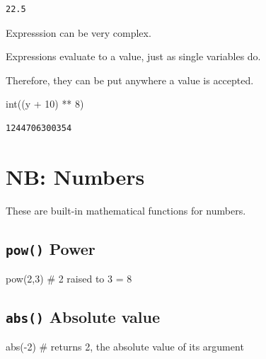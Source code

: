 \documentclass[
  letterpaper,
  DIV=11,
  numbers=noendperiod]{scrreprt}
\newenvironment{Shaded}{\begin{snugshade}}{\end{snugshade}}
\newcommand{\BuiltInTok}[1]{\textcolor[rgb]{0.00,0.23,0.31}{#1}}
\newcommand{\CommentTok}[1]{\textcolor[rgb]{0.37,0.37,0.37}{#1}}
\newcommand{\DecValTok}[1]{\textcolor[rgb]{0.68,0.00,0.00}{#1}}
\newcommand{\NormalTok}[1]{\textcolor[rgb]{0.00,0.23,0.31}{#1}}
\newcommand{\OperatorTok}[1]{\textcolor[rgb]{0.37,0.37,0.37}{#1}}
\begin{document}
\begin{verbatim}
22.5
\end{verbatim}

Expresssion can be very complex.

Expressions evaluate to a value, just as single variables do.

Therefore, they can be put anywhere a value is accepted.

\begin{Shaded}
\begin{Highlighting}[]
\BuiltInTok{int}\NormalTok{((y }\OperatorTok{+} \DecValTok{10}\NormalTok{) }\OperatorTok{**} \DecValTok{8}\NormalTok{)}
\end{Highlighting}
\end{Shaded}

\begin{verbatim}
1244706300354
\end{verbatim}

\hypertarget{nb-numbers}{%
\chapter{NB: Numbers}\label{nb-numbers}}

These are built-in mathematical functions for numbers.

\hypertarget{pow-power}{%
\section{\texorpdfstring{\texttt{pow()}
Power}{pow() Power}}\label{pow-power}}

\begin{Shaded}
\begin{Highlighting}[]
\BuiltInTok{pow}\NormalTok{(}\DecValTok{2}\NormalTok{,}\DecValTok{3}\NormalTok{) }\CommentTok{\# 2 raised to 3 = 8}
\end{Highlighting}
\end{Shaded}

\hypertarget{abs-absolute-value}{%
\section{\texorpdfstring{\texttt{abs()} Absolute
value}{abs() Absolute value}}\label{abs-absolute-value}}

\begin{Shaded}
\begin{Highlighting}[]
\BuiltInTok{abs}\NormalTok{(}\OperatorTok{{-}}\DecValTok{2}\NormalTok{) }\CommentTok{\# returns 2, the absolute value of its argument}
\end{Highlighting}
\end{Shaded}
\end{document}

